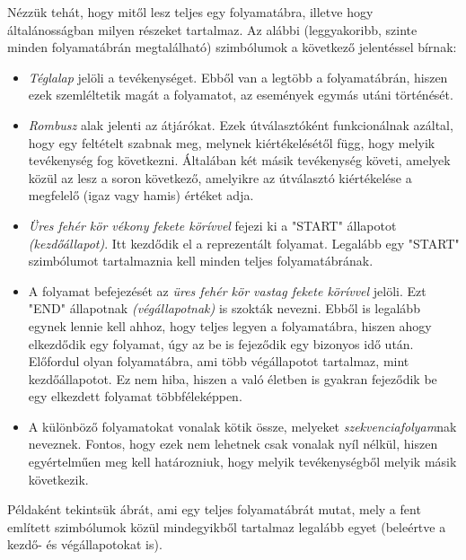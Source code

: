 Nézzük tehát, hogy mitől lesz teljes egy folyamatábra, illetve hogy általánosságban milyen részeket tartalmaz. Az alábbi (leggyakoribb, szinte minden folyamatábrán megtalálható) szimbólumok a következő jelentéssel bírnak:

\begin{itemize}
\item \textit{Téglalap} jelöli a tevékenységet. Ebből van a legtöbb a folyamatábrán, hiszen ezek szemléltetik magát a folyamatot, az események egymás utáni történését.
\item \textit{Rombusz} alak jelenti az átjárókat. Ezek útválasztóként funkcionálnak azáltal, hogy egy feltételt szabnak meg, melynek kiértékelésétől függ, hogy melyik tevékenység fog következni. Általában két másik tevékenység követi, amelyek közül az lesz a soron következő, amelyikre az útválasztó kiértékelése a megfelelő (igaz vagy hamis) értéket adja.
\item \textit{Üres fehér kör vékony fekete körívvel} fejezi ki a "START" állapotot \textit{(kezdőállapot)}. Itt kezdődik el a reprezentált folyamat. Legalább egy "START" szimbólumot tartalmaznia kell minden teljes folyamatábrának.
\item A folyamat befejezését az \textit{üres fehér kör vastag fekete körívvel} jelöli. Ezt "END" állapotnak \textit{(végállapotnak)} is szokták nevezni. Ebből is legalább egynek lennie kell ahhoz, hogy teljes legyen a folyamatábra, hiszen ahogy elkezdődik egy folyamat, úgy az be is fejeződik egy bizonyos idő után. Előfordul olyan folyamatábra, ami több végállapotot tartalmaz, mint kezdőállapotot. Ez nem hiba, hiszen a való életben is gyakran fejeződik be egy elkezdett folyamat többféleképpen.
\item A különböző folyamatokat vonalak kötik össze, melyeket \textit{szekvenciafolyam}nak neveznek. Fontos, hogy ezek nem lehetnek csak vonalak nyíl nélkül, hiszen egyértelműen meg kell határozniuk, hogy melyik tevékenységből melyik másik következik.
\end{itemize}

Példaként tekintsük  ábrát, ami egy teljes folyamatábrát mutat, mely a fent említett szimbólumok közül mindegyikből tartalmaz legalább egyet (beleértve a kezdő- és végállapotokat is).

